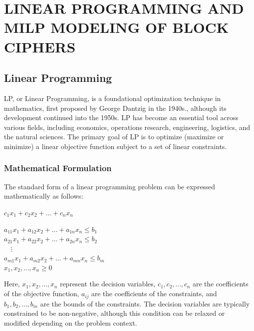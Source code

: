 \chapter{LINEAR PROGRAMMING AND MILP MODELING OF BLOCK CIPHERS}\label{ch:milp}

\section{Linear Programming}
LP, or Linear Programming, is a foundational optimization technique in mathematics, first proposed by George Dantzig in the 1940s.\cite{dantzig2002linear}, although its development continued into the 1950s. LP has become an essential tool across various fields, including economics, operations research, engineering, logistics, and the natural sciences. The primary goal of LP is to optimize (maximize or minimize) a linear objective function subject to a set of linear constraints.

\subsection{Mathematical Formulation}
The standard form of a linear programming problem can be expressed mathematically as follows:

\begin{center}
    $c_1x_1 + c_2x_2 + \dots + c_nx_n $
\end{center}
\begin{center}
    $  a_{11}x_1 + a_{12}x_2 + \dots + a_{1n}x_n \leq b_1 $ \\
    $ a_{21}x_1 + a_{22}x_2 + \dots + a_{2n}x_n \leq b_2 $ \\
    $ \quad \vdots $ \\
    $ a_{m1}x_1 + a_{m2}x_2 + \dots + a_{mn}x_n \leq b_m $ \\
    $ x_{1}, x_{2}, \dots, x_n \geq 0 $
\end{center}

Here, $ x_1, x_2, \dots, x_n $ represent the decision variables, $ c_1, c_2, \dots, c_n $ are the coefficients of the objective function, $ a_{ij} $ are the coefficients of the constraints, and $ b_1, b_2, \dots, b_m $ are the bounds of the constraints. The decision variables are typically constrained to be non-negative, although this condition can be relaxed or modified depending on the problem context.

